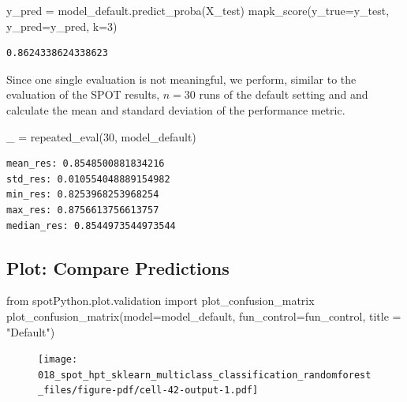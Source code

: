 \documentclass[
  letterpaper,
  DIV=11,
  numbers=noendperiod]{scrreprt}
\newenvironment{Shaded}{\begin{snugshade}}{\end{snugshade}}
\newcommand{\DecValTok}[1]{\textcolor[rgb]{0.68,0.00,0.00}{#1}}
\newcommand{\ImportTok}[1]{\textcolor[rgb]{0.00,0.46,0.62}{#1}}
\newcommand{\NormalTok}[1]{\textcolor[rgb]{0.00,0.23,0.31}{#1}}
\newcommand{\OperatorTok}[1]{\textcolor[rgb]{0.37,0.37,0.37}{#1}}
\newcommand{\StringTok}[1]{\textcolor[rgb]{0.13,0.47,0.30}{#1}}
\begin{document}
\begin{Shaded}
\begin{Highlighting}[]
\NormalTok{y\_pred }\OperatorTok{=}\NormalTok{ model\_default.predict\_proba(X\_test)}
\NormalTok{mapk\_score(y\_true}\OperatorTok{=}\NormalTok{y\_test, y\_pred}\OperatorTok{=}\NormalTok{y\_pred, k}\OperatorTok{=}\DecValTok{3}\NormalTok{)}
\end{Highlighting}
\end{Shaded}

\begin{verbatim}
0.8624338624338623
\end{verbatim}

Since one single evaluation is not meaningful, we perform, similar to
the evaluation of the SPOT results, \(n=30\) runs of the default setting
and and calculate the mean and standard deviation of the performance
metric.

\begin{Shaded}
\begin{Highlighting}[]
\NormalTok{\_ }\OperatorTok{=}\NormalTok{ repeated\_eval(}\DecValTok{30}\NormalTok{, model\_default)}
\end{Highlighting}
\end{Shaded}

\begin{verbatim}
mean_res: 0.8548500881834216
std_res: 0.010554048889154982
min_res: 0.8253968253968254
max_res: 0.8756613756613757
median_res: 0.8544973544973544
\end{verbatim}

\hypertarget{plot-compare-predictions-1}{%
\subsection{Plot: Compare
Predictions}\label{plot-compare-predictions-1}}

\begin{Shaded}
\begin{Highlighting}[]
\ImportTok{from}\NormalTok{ spotPython.plot.validation }\ImportTok{import}\NormalTok{ plot\_confusion\_matrix}
\NormalTok{plot\_confusion\_matrix(model}\OperatorTok{=}\NormalTok{model\_default, fun\_control}\OperatorTok{=}\NormalTok{fun\_control, title }\OperatorTok{=} \StringTok{"Default"}\NormalTok{)}
\end{Highlighting}
\end{Shaded}

\begin{figure}[H]

{\centering \texttt{[image: 018\_spot\_hpt\_sklearn\_multiclass\_classification\_randomforest\_files/figure-pdf/cell-42-output-1.pdf]}

}

\end{figure}
\end{document}
